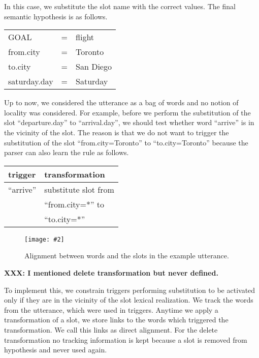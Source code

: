 \documentclass[11pt]{article}
\newcommand{\fgrparam}[4]{
  \begin{figure}[htbp]
    \begin{center}
      \leavevmode
      \texttt{[image: \#2]}
    \end{center}
    \caption{#4}
    \label{#3}
  \end{figure}
}
\begin{document}
In this case, we substitute the slot name with the correct values. The final semantic hypothesis is as follows.

\vspace{.25cm}
\begin{tabular}{lll}
  GOAL          & = & flight \\
  from.city     & = & Toronto \\
  to.city       & = & San Diego \\
  saturday.day & = & Saturday \\
\end{tabular} 
\vspace{.25cm}

Up to now, we considered the utterance as a bag of words and no notion of locality was considered. For example, before we perform the substitution of the slot ``departure.day'' to ``arrival.day'', we should test whether word ``arrive'' is in the vicinity of the slot. The reason is that we do not want to trigger the substitution of the slot ``from.city=Toronto'' to ``to.city=Toronto'' because the parser can also learn the rule as follows. 

\vspace{.25cm}
\begin{tabular}{ll}
  trigger & transformation \\
  \hline 
  ``arrive''            & substitute slot from\\
                        & ``from.city=*'' to \\
                        & ``to.city=*'' \\
\end{tabular} 
\vspace{.25cm}
\fgrparam{width=8cm}{./fig/words-slots-alignment.pdf}{fig:alignment}{Alignment between words and the slots in the example utterance.}

\textbf{XXX: I mentioned delete transformation but never defined.}

To implement this, we constrain triggers performing substitution to be activated only if they are in the vicinity of the slot lexical realization.  We track the words from the utterance, which were used in triggers. Anytime we apply a transformation of a slot, we store links to the words which triggered the transformation. We call this links as direct alignment. For the delete transformation no tracking information is kept because a slot is removed from hypothesis and never used again.
\end{document}
